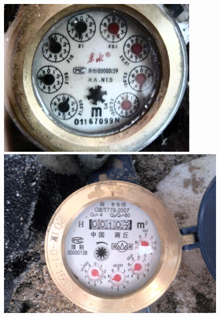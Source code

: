 \documentclass[a4paper]{ctexart}
\begin{document}
\begin{figure}[htbp]
	\centering
	\begin{minipage}[t]{0.25\textwidth}
		\centering
		\includegraphics[width=\textwidth]{figure/equalizeHist/img1.jpg}
	\end{minipage}
	\begin{minipage}[t]{0.25\textwidth}
		\centering
		\includegraphics[width=\textwidth]{figure/equalizeHist/img2.jpg}
	\end{minipage}\\
	\begin{minipage}[t]{0.25\textwidth}
		\centering

\end{minipage}
\end{figure}
\end{document}
